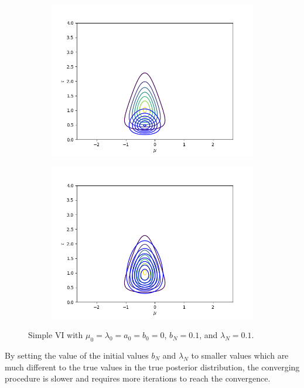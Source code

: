 \documentclass[11pt]{extarticle}
\newcommand{\0}{\mathbf{0}}
\renewcommand{\(}{\left(}
\renewcommand{\)}{\right)}
\theoremstyle{definition}
\begin{document}
\begin{enumerate}
\begin{figure}[!ht]
\begin{subfigure}{.45\textwidth}
			\includegraphics[width=\linewidth]{2_4_2_3}
		\end{subfigure}
		\begin{subfigure}{.45\textwidth}
			\includegraphics[width=\linewidth]{2_4_2_6}
		\end{subfigure}
		\caption{Simple VI with $\mu_{0} = \lambda_{0} = a_{0} = b_{0} = 0$, $b_{N} = 0.1$, and $\lambda_{N} = 0.1$.}
		\label{fig:2_4_2}
	\end{figure}
	\par By setting the value of the initial values $b_{N}$ and $\lambda_{N}$ to smaller values which are much different to the true values in the true posterior distribution, the converging procedure is slower and requires more iterations to reach the convergence.
	

\end{enumerate}
\end{document}
